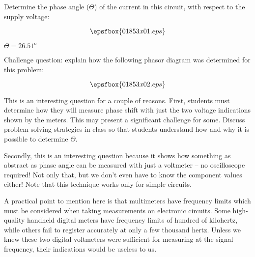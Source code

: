 

Determine the phase angle ($\Theta$) of the current in this circuit, with respect to the supply voltage:

$$\epsfbox{01853x01.eps}$$







$\Theta = 26.51^o$

\vskip 10pt

Challenge question: explain how the following phasor diagram was determined for this problem:

$$\epsfbox{01853x02.eps}$$







This is an interesting question for a couple of reasons.  First, students must determine how they will measure phase shift with just the two voltage indications shown by the meters.  This may present a significant challenge for some.  Discuss problem-solving strategies in class so that students understand how and why it is possible to determine $\Theta$.

Secondly, this is an interesting question because it shows how something as abstract as phase angle can be measured with just a voltmeter -- no oscilloscope required!  Not only that, but we don't even have to know the component values either!  Note that this technique works only for simple circuits.

A practical point to mention here is that multimeters have frequency limits which must be considered when taking measurements on electronic circuits.  Some high-quality handheld digital meters have frequency limits of hundred of kilohertz, while others fail to register accurately at only a few thousand hertz.  Unless we knew these two digital voltmeters were sufficient for measuring at the signal frequency, their indications would be useless to us.




